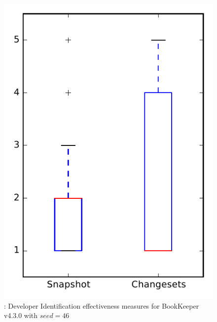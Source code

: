 
\begin{figure}
\centering
\includegraphics[height=0.4\textheight]{figures/dit_seed/rq1_bookkeeper_46}
\caption{\rtwo: Developer Identification effectiveness measures for BookKeeper v4.3.0 with $seed=46$}
\label{fig:dit_seed:rq1:bookkeeper}
\end{figure}

